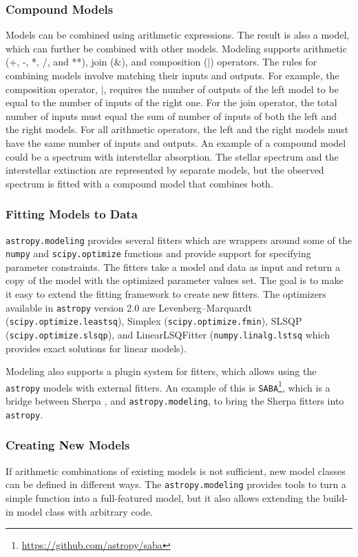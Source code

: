 \documentclass[modern]{aastex61}
\newcommand{\package}[1]{\texttt{#1}\xspace}
\newcommand{\astropypkg}{\package{astropy}}
\begin{document}
\subsubsection{Compound Models}
Models can be combined using arithmetic expressions. The result is also a model, which can further be combined with other models. Modeling supports arithmetic (+, -, *, /, and **), join ($\&$), and composition ($|$) operators. The rules for combining models involve matching their inputs and outputs. For example, the composition operator, $|$, requires the number of outputs of the left model to be equal to the number of inputs of the right one. For the join operator, the total number of inputs must equal the sum of number of inputs of both the left and the right models. For all arithmetic operators, the left and the right models must have the same number of inputs and outputs. An example of a compound model could be a spectrum with interstellar absorption. The stellar spectrum and the interstellar extinction are represented by separate models, but the observed spectrum is fitted with a compound model that combines both.

\subsubsection{Fitting Models to Data}

\package{astropy.modeling} provides several fitters which are wrappers around some of the \texttt{numpy} and \texttt{scipy.optimize} functions and provide support for specifying parameter constraints. The fitters take a model and data as input and return a copy of the model with the optimized parameter values set. The goal is to make it easy to extend the fitting framework to create new fitters. The optimizers available in \astropypkg version 2.0 are Levenberg--Marquardt (\texttt{scipy.optimize.leastsq}), Simplex (\texttt{scipy.optimize.fmin}), SLSQP (\texttt{scipy.optimize.slsqp}), and LinearLSQFitter (\texttt{numpy.linalg.lstsq} which provides exact solutions for linear models).

Modeling also supports a plugin system for fitters, which allows using the
\astropypkg models with external fitters. An example of this is
\package{SABA}\footnote{\url{https://github.com/astropy/saba}}, which is a bridge between
Sherpa \citep{sherpa},
and \package{astropy.modeling}, to bring the Sherpa fitters into \astropypkg.

\subsubsection{Creating New Models}
If arithmetic combinations of existing models is not sufficient, new model classes can be defined in different ways. The \package{astropy.modeling} provides tools to turn a simple function into a full-featured model, but it also allows extending the build-in model class with arbitrary code.
\end{document}
